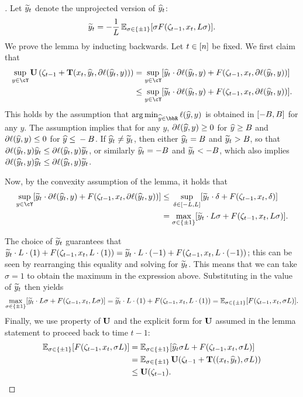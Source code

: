 \begin{proof}[]
Let $\wt{y}_t$ denote the unprojected version of $\pred_t$:
\[
  \wt{y}_{t}= - \frac{1}{L}\En_{\sigma\in\pmo}\brk*{
  \sigma{}F(\zeta_{t-1}, x_{t}, L\sigma)
  }.
\]
We prove the lemma by inducting backwards. Let $t\in\brk*{n}$ be fixed. We first claim that
\begin{align*}
\sup_{y\in\cY} \burk\left(\zeta_{t-1} + \suff(x_t,\pred_t,\partial \loss(\pred_t,y))\right)
& = 
\sup_{y\in\cY}\brk*{\pred_t\cdot\partial \loss(\pred_t,y) + F(\zeta_{t-1}, x_t, \partial \loss(\pred_t,y))} \\ 
& \leq 
\sup_{y\in\cY}\brk*{\predt_t\cdot\partial \loss(\pred_t,y) + F(\zeta_{t-1}, x_t, \partial \loss(\pred_t,y))}.
\end{align*}
This holds by the assumption that $\argmin_{\yh\in\bbR}\ls(\yh, y)$ is obtained in $\brk*{-B, B}$ for any $y$. The assumption implies that for any $y$, $\partial\ls(\yh, y)\geq{}0$ for $\pred\geq{}B$ and $\partial\ls(\yh, y)\leq{}0$ for $\pred\leq{}-B$. If $\yh_{t}\neq{}\predt_t$, then either $\yh_{t}=B$ and $\predt_{t}>B$, so that $\partial\ls(\yh_{t}, y)\yh_{t}\leq{}\partial\ls(\yh_{t}, y)\predt_{t}$, or similarly $\yh_{t}=-B$ and $\predt_{t}<-B$, which also implies $\partial\ls(\yh_{t}, y)\yh_{t}\leq{}\partial\ls(\yh_{t}, y)\predt_{t}$.

Now, by the convexity assumption of the lemma, it holds that
\begin{align*}
\sup_{y\in\cY}\brk*{\predt_t\cdot\partial \loss(\pred_t,y) + F(\zeta_{t-1}, x_t, \partial \loss(\pred_t,y))}
&\leq{} \sup_{\delta\in\brk*{-L, L}}\brk*{\predt_t\cdot\delta + F(\zeta_{t-1}, x_t, \delta)} \\
&= \max_{\sigma\in\pmo}\brk*{\predt_t\cdot{}L\sigma + F(\zeta_{t-1}, x_t, L\sigma)}.
\end{align*}

The choice of $\predt_t$ guarantees that $\predt_t\cdot{}L\cdot(1) + F(\zeta_{t-1}, x_t, L\cdot(1)) = \predt_t\cdot{}L\cdot{}(-1) + F(\zeta_{t-1}, x_t, L\cdot(-1))$; this can be seen by rearranging this equality and solving for $\predt_t$. This means that we can take $\sigma=1$ to obtain the maximum in the expression above. Substituting in the value of $\predt_{t}$ then yields
\[
\max_{\sigma\in\pmo}\brk*{\predt_t\cdot{}L\sigma + F(\zeta_{t-1}, x_t, L\sigma)}
=\predt_t\cdot{}L\cdot(1) + F(\zeta_{t-1}, x_t, L\cdot(1)) = \En_{\sigma\in\pmo}\brk*{F(\zeta_{t-1}, x_t, \sigma{}L)}.
\]
Finally, we use property \propthreep{} of $\burk$ and the explicit form for $\burk$ assumed in the lemma statement to proceed back to time $t-1$:
\begin{align*}
\En_{\sigma\in\pmo}\brk*{F(\zeta_{t-1}, x_{t}, \sigma{}L)} &= \En_{\sigma\in\pmo}\brk*{\yh_{t}\sigma{}L+F(\zeta_{t-1}, x_{t}, \sigma{}L)} \\
&= \En_{\sigma\in\pmo}\burk(\zeta_{t-1} + \suff((x_t,\yh_t) , \sigma{}L)) \\ &\leq{} \burk(\zeta_{t-1}).
\end{align*}
\end{proof}
